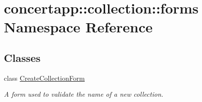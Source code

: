 \hypertarget{namespaceconcertapp_1_1collection_1_1forms}{
\section{concertapp::collection::forms Namespace Reference}
\label{namespaceconcertapp_1_1collection_1_1forms}
}
\subsection*{Classes}
\begin{DoxyCompactItemize}
\item 
class \hyperlink{classconcertapp_1_1collection_1_1forms_1_1_create_collection_form}{CreateCollectionForm}
\begin{DoxyCompactList}\small\item\em A form used to validate the name of a new collection. \item\end{DoxyCompactList}\end{DoxyCompactItemize}
